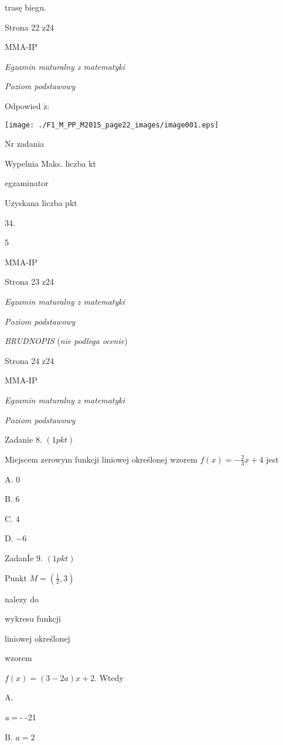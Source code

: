 \documentclass[a4paper,12pt]{article}
\begin{document}
trasę biegu.

Strona 22 z24

MMA-IP





{\it Egzamin maturalny z matematyki}

{\it Poziom podstawowy}

Odpowied $\acute{\mathrm{z}}$:
\begin{center}
\texttt{[image: ./F1\_M\_PP\_M2015\_page22\_images/image001.eps]}
\end{center}
Nr zadania

Wypelnia Maks. liczba kt

egzaminator

Uzyskana liczba pkt

34.

5

MMA-IP

Strona 23 z24





{\it Egzamin maturalny z matematyki}

{\it Poziom podstawowy}

{\it BRUDNOPIS} ({\it nie podlega ocenie})

Strona 24 z24

MMA-IP





{\it Egzamin maturalny z matematyki}

{\it Poziom podstawowy}

Zadanie 8. $(1pkt)$

Miejscem zerowym funkcji liniowej określonej wzorem $f(x)=-\displaystyle \frac{2}{3}x+4$ jest

A. 0

B. 6

C. 4

D. $-6$

ZadanÍe 9. $(1pkt)$

Punkt $M=(\displaystyle \frac{1}{2},3)$

nalezy do

wykresu funkcji

liniowej określonej

wzorem

$f(x)=(3-2a)x+2$. Wtedy

A.

{\it a}$=$- -21

B. $a=2$
\end{document}
